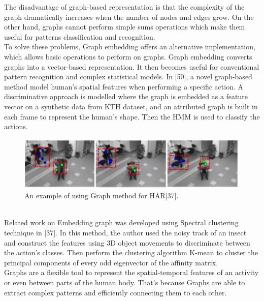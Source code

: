 The disadvantage of graph-based representation is that the complexity of the graph dramatically increases when the number of nodes and edges grow. On the other hand, graphs cannot perform simple sums operations which make them useful for patterns classification and recognition.\\

To solve these problems, Graph embedding offers an alternative implementation, which allows basic operations to perform on graphs. Graph embedding converts graphs into a vector-based representation. It then becomes useful for conventional pattern recognition and complex statistical models. In [50], a novel graph-based method model human’s spatial features when performing a specific action. A discriminative approach is modelled where the graph is embedded as a feature vector on a synthetic data from KTH dataset, and an attributed graph is built in each frame to represent the human’s shape. Then the HMM is used to classify the actions.
\begin{figure}[ht]
\centering
\includegraphics{Figures/gr1}
\decoRule
\caption[An example of using Graph method for HAR "37"]{An example of using Graph method for HAR[37].}
\label{fig:la}
\end{figure}\hfill \\

Related work on Embedding graph was developed using Spectral clustering technique in [37]. In this method, the author used the noisy track of an insect and construct the features using 3D object movements to discriminate between the action’s classes. Then perform the clustering algorithm K-mean to cluster the principal components of every odd eigenvector of the affinity matrix.\\

Graphs are a flexible tool to represent the spatial-temporal features of an activity or even between parts of the human body. That’s because Graphs are able to extract complex patterns and efficiently connecting them to each other. 
